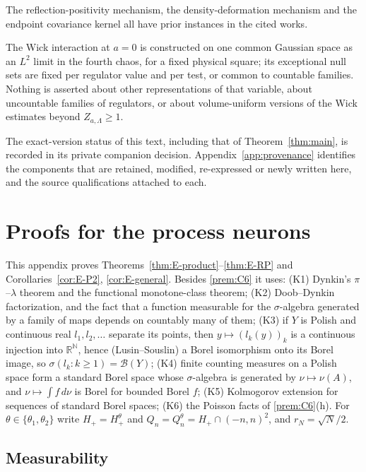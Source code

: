 \documentclass[11pt]{article}
\theoremstyle{plain}
\theoremstyle{definition}
\theoremstyle{remark}
\newcommand{\R}{\mathbb{R}}
\newcommand{\N}{\mathbb{N}}
\newcommand{\cB}{\mathcal{B}}
\begin{document}
The reflection-positivity mechanism, the density-deformation mechanism and the
endpoint covariance kernel all have prior instances in the cited works.

The Wick interaction at $a=0$ is constructed on one common Gaussian space as an
$L^{2}$ limit in the fourth chaos, for a fixed physical square; its exceptional
null sets are fixed per regulator value and per test, or common to countable
families. Nothing is asserted about other representations of that variable,
about uncountable families of regulators, or about volume-uniform versions of
the Wick estimates beyond $Z_{a,\Lambda}\ge1$.

The exact-version status of this text, including that of
Theorem~\ref{thm:main}, is recorded in its private companion decision.
Appendix~\ref{app:provenance} identifies the components that are retained,
modified, re-expressed or newly written here, and the source qualifications
attached to each.

\appendix

\section{Proofs for the process neurons}\label{app:E}

This appendix proves Theorems~\ref{thm:E-product}--\ref{thm:E-RP} and
Corollaries~\ref{cor:E-P2}, \ref{cor:E-general}. Besides \ref{prem:C6} it uses:
(K1) Dynkin's $\pi$--$\lambda$ theorem and the functional monotone-class theorem;
(K2) Doob--Dynkin factorization, and the fact that a function measurable for the
$\sigma$-algebra generated by a family of maps depends on countably many of them;
(K3) if $Y$ is Polish and continuous real $l_1,l_2,\dots$ separate its points, then
$y\mapsto(l_k(y))_k$ is a continuous injection into $\R^{\N}$, hence (Lusin--Souslin) a
Borel isomorphism onto its Borel image, so $\sigma(l_k:k\ge1)=\cB(Y)$; (K4) finite
counting measures on a Polish space form a standard Borel space whose
$\sigma$-algebra is generated by $\nu\mapsto\nu(A)$, and $\nu\mapsto\int f\,d\nu$ is Borel for
bounded Borel $f$; (K5) Kolmogorov extension for sequences of standard Borel
spaces; (K6) the Poisson facts of \ref{prem:C6}(h). For $\theta\in\{\theta_1,\theta_2\}$ write
$H_+=H^{\theta}_{+}$ and $Q_n=Q^{\theta}_n=H_+\cap(-n,n)^{2}$, and $r_N=\sqrt N/2$.

\subsection{Measurability}
\end{document}
